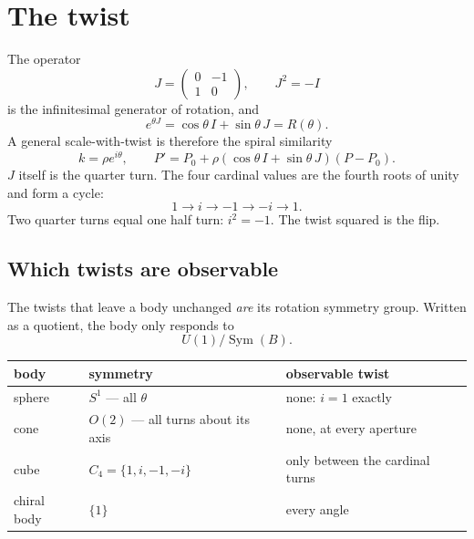 \documentclass[11pt,fleqn]{article}
\begin{document}
\section{The twist}

The operator
\begin{equation}
J = \begin{pmatrix} 0 & -1 \\ 1 & 0 \end{pmatrix},
\qquad J^2 = -I
\end{equation}
is the infinitesimal generator of rotation, and
\begin{equation}
e^{\theta J} = \cos\theta\, I + \sin\theta\, J = R(\theta).
\end{equation}
A general scale-with-twist is therefore the spiral similarity
\begin{equation}
k = \rho e^{i\theta}, \qquad
P' = P_0 + \rho\left(\cos\theta\, I + \sin\theta\, J\right)(P - P_0).
\end{equation}
$J$ itself is the quarter turn. The four cardinal values are the fourth roots of unity and form a
cycle:
\begin{equation}
1 \to i \to -1 \to -i \to 1.
\end{equation}
Two quarter turns equal one half turn: $i^2 = -1$. The twist squared is the flip.

\subsection*{Which twists are observable}

The twists that leave a body unchanged \emph{are} its rotation symmetry group. Written as a
quotient, the body only responds to
\begin{equation}
U(1) / \operatorname{Sym}(B).
\end{equation}

\begin{table}[H]
\centering
\begin{tabular}{@{}llp{6cm}@{}}
\toprule
body & symmetry & observable twist \\
\midrule
sphere & $S^1$ --- all $\theta$ & none: $i = 1$ exactly \\
cone & $O(2)$ --- all turns about its axis & none, at every aperture \\
cube & $C_4 = \{1, i, -1, -i\}$ & only between the cardinal turns \\
chiral body & $\{1\}$ & every angle \\
\bottomrule
\end{tabular}
\end{table}
\end{document}
